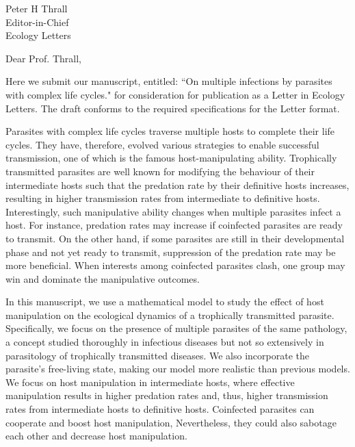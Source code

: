 \documentclass[10,DIN, pagenumber=false, parskip=half,fromalign=right, fromphone=false,fromemail=true, fromurl=false,fromlogo=true, fromrule=false]{scrlttr2}
\begin{document}
\sffamily

\begin{letter}{
\sffamily
\vspace{-0.4cm}
Peter H Thrall\\
Editor-in-Chief\\
Ecology Letters
}
\opening{\sffamily \vspace{-1cm} Dear Prof. Thrall,}
\vspace{-0.3cm}

Here we submit our manuscript, entitled: ``On multiple infections by parasites with complex life cycles." for consideration for publication as a Letter in Ecology Letters. 
The draft conforms to the required specifications for the Letter format.

Parasites with complex life cycles traverse multiple hosts to complete their life cycles.
They have, therefore, evolved various strategies to enable successful transmission, one of which is the famous host-manipulating ability.
Trophically transmitted parasites are well known for modifying the behaviour of their intermediate hosts such that the predation rate by their definitive hosts increases, resulting in higher transmission rates from intermediate to definitive hosts.
Interestingly, such manipulative ability changes when multiple parasites infect a host. 
For instance, predation rates may increase if coinfected parasites are ready to transmit. 
On the other hand, if some parasites are still in their developmental phase and not yet ready to transmit, suppression of the predation rate may be more beneficial.
When interests among coinfected parasites clash, one group may win and dominate the manipulative outcomes.

In this manuscript, we use a mathematical model to study the effect of host manipulation on the ecological dynamics of a trophically transmitted parasite.
Specifically, we focus on the presence of multiple parasites of the same pathology, a concept studied thoroughly in infectious diseases but not so extensively in parasitology of trophically transmitted diseases.
We also incorporate the parasite's free-living state, making our model more realistic than previous models.
We focus on host manipulation in intermediate hosts, where effective manipulation results in higher predation rates and, thus, higher transmission rates from intermediate hosts to definitive hosts.
Coinfected parasites can cooperate and boost host manipulation,
Nevertheless, they could also sabotage each other and decrease host manipulation.


\end{letter}
\end{document}
